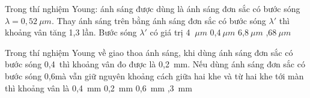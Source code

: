 \begin{ex}%
Trong thí nghiệm Young: ánh sáng được dùng là ánh sáng đơn sắc có bước sóng $\lambda =0,52\ \mu m$. Thay ánh sáng trên bằng ánh sáng đơn sắc có bước sóng $\lambda '$ thì khoảng vân tăng 1,3 lần. Bước sóng $\lambda'$ có giá trị 
\choice
{4 $\ \mu m$}
{0,4$\ \mu m$}
{6,8$\ \mu m$}
{,68$\ \mu m$}
\end{ex} 
\begin{ex}%
Trong thí nghiệm Young về giao thoa ánh sáng, khi dùng ánh sáng đơn sắc có bước sóng 0,4\microm\ thì khoảng vân đo được là 0,2\ mm. Nếu dùng ánh sáng đơn sắc có bước sóng 0,6\microm mà vẫn giữ nguyên khoảng cách giữa hai khe và từ hai khe tới màn thì khoảng vân là
\choice
{0,4\ mm}
{0,2\ mm}
{0,6\ mm}
{,3\ mm}
\end{ex} 

